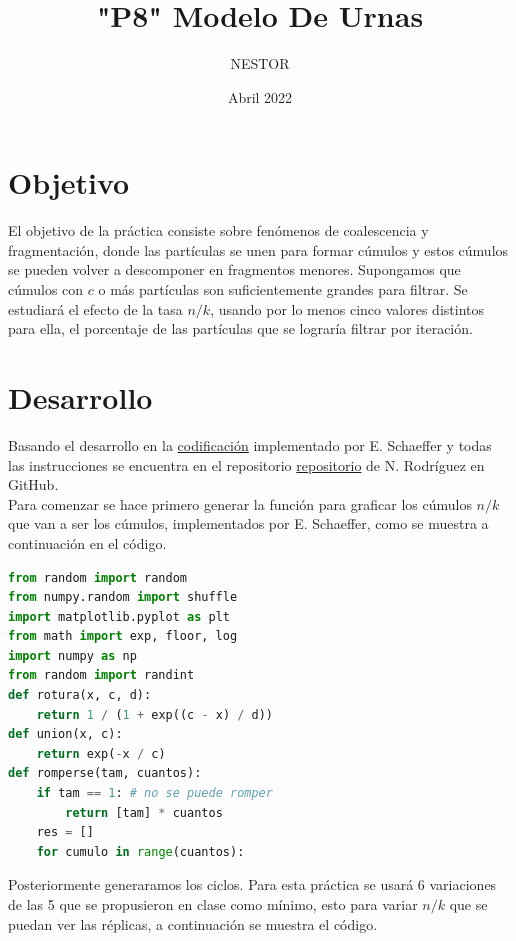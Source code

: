 \documentclass{article}
\title{"P8" Modelo De Urnas}
\author{NESTOR}
\date {Abril 2022}
\begin{document}
\maketitle

\section{Objetivo}\label{obj}
El objetivo de la práctica consiste sobre fenómenos de coalescencia y fragmentación, donde las partículas se unen para formar cúmulos y estos cúmulos se pueden volver a descomponer en fragmentos menores. Supongamos que cúmulos con $c$ o más partículas son suficientemente grandes para filtrar. Se estudiará el efecto de la tasa $n/k$, usando por lo menos cinco valores distintos para ella, el porcentaje de las partículas que se lograría filtrar por iteración. \cite{elisa1}

\section{Desarrollo}\label{des}
Basando el desarrollo en la \href{https://github.com/satuelisa/Simulation/blob/master/UrnModel/onlyAggr.py}{codificación} implementado por E. Schaeffer \cite{elisa1} y todas las instrucciones se encuentra en el repositorio \href{https://github.com/NestorZeus/SIMULACION-COMPUTACIONAL-DE-NANOMATERIALES/tree/main/P8}{repositorio} de N. Rodríguez en GitHub.\\

Para comenzar se hace primero generar la función para graficar los cúmulos $n/k$ que van a ser los cúmulos, implementados por E. Schaeffer, como se muestra a continuación en el código.

\begin{lstlisting}[caption=Generamos la función, language=Python]
from random import random
from numpy.random import shuffle
import matplotlib.pyplot as plt
from math import exp, floor, log
import numpy as np
from random import randint
def rotura(x, c, d):
    return 1 / (1 + exp((c - x) / d))
def union(x, c):
    return exp(-x / c)
def romperse(tam, cuantos):
    if tam == 1: # no se puede romper
        return [tam] * cuantos
    res = []
    for cumulo in range(cuantos):
\end{lstlisting}

Posteriormente generaramos los ciclos. Para esta práctica se usará 6 variaciones de las 5 que se propusieron en clase como mínimo, esto para variar $n/k$ que se puedan ver las réplicas, a continuación se muestra el código.
\end{document}
